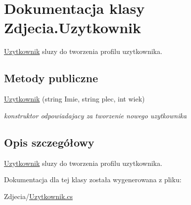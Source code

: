 \hypertarget{class_zdjecia_1_1_uzytkownik}{}\section{Dokumentacja klasy Zdjecia.\+Uzytkownik}
\label{class_zdjecia_1_1_uzytkownik}


\hyperlink{class_zdjecia_1_1_uzytkownik}{Uzytkownik} sluzy do tworzenia profilu uzytkownika.  


\subsection*{Metody publiczne}
\begin{DoxyCompactItemize}
\item 
\hyperlink{class_zdjecia_1_1_uzytkownik_aae2542fc4872b1d3fcb76477433fad49}{Uzytkownik} (string Imie, string plec, int wiek)\hypertarget{class_zdjecia_1_1_uzytkownik_aae2542fc4872b1d3fcb76477433fad49}{}\label{class_zdjecia_1_1_uzytkownik_aae2542fc4872b1d3fcb76477433fad49}

\begin{DoxyCompactList}\small\item\em konstruktor odpowiadajacy za tworzenie nowego uzytkownika \end{DoxyCompactList}\end{DoxyCompactItemize}


\subsection{Opis szczegółowy}
\hyperlink{class_zdjecia_1_1_uzytkownik}{Uzytkownik} sluzy do tworzenia profilu uzytkownika. 

Dokumentacja dla tej klasy została wygenerowana z pliku\+:\begin{DoxyCompactItemize}
\item 
Zdjecia/\hyperlink{_uzytkownik_8cs}{Uzytkownik.\+cs}\end{DoxyCompactItemize}
